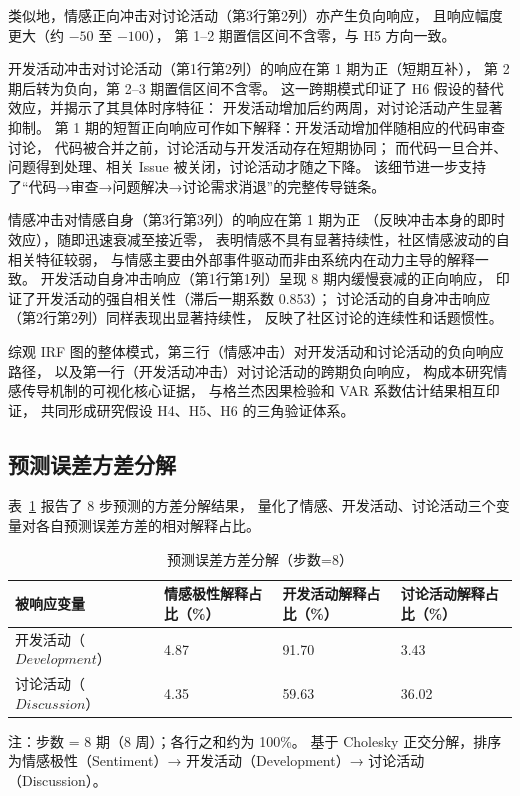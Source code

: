 \documentclass[
    type = master, %
    degree = professional,        %
    decl-page,  %
    twoside,                %
    fontset = fandol %
  ]{njuthesis}
\begin{document}
类似地，情感正向冲击对讨论活动（第3行第2列）亦产生负向响应，
且响应幅度更大（约 $-50$ 至 $-100$），
第 1--2 期置信区间不含零，与 H5 方向一致。

开发活动冲击对讨论活动（第1行第2列）的响应在第 1 期为正（短期互补），
第 2 期后转为负向，第 2--3 期置信区间不含零。
这一跨期模式印证了 H6 假设的替代效应，并揭示了其具体时序特征：
开发活动增加后约两周，对讨论活动产生显著抑制。
第 1 期的短暂正向响应可作如下解释：开发活动增加伴随相应的代码审查讨论，
代码被合并之前，讨论活动与开发活动存在短期协同；
而代码一旦合并、问题得到处理、相关 Issue 被关闭，讨论活动才随之下降。
该细节进一步支持了“代码→审查→问题解决→讨论需求消退”的完整传导链条。

情感冲击对情感自身（第3行第3列）的响应在第 1 期为正
（反映冲击本身的即时效应），随即迅速衰减至接近零，
表明情感不具有显著持续性，社区情感波动的自相关特征较弱，
与情感主要由外部事件驱动而非由系统内在动力主导的解释一致。
开发活动自身冲击响应（第1行第1列）呈现 8 期内缓慢衰减的正向响应，
印证了开发活动的强自相关性（滞后一期系数 0.853）；
讨论活动的自身冲击响应（第2行第2列）同样表现出显著持续性，
反映了社区讨论的连续性和话题惯性。

综观 IRF 图的整体模式，第三行（情感冲击）对开发活动和讨论活动的负向响应路径，
以及第一行（开发活动冲击）对讨论活动的跨期负向响应，
构成本研究情感传导机制的可视化核心证据，
与格兰杰因果检验和 VAR 系数估计结果相互印证，
共同形成研究假设 H4、H5、H6 的三角验证体系。

\subsection{预测误差方差分解}

表~\ref{tab:fevd} 报告了 8 步预测的方差分解结果，
量化了情感、开发活动、讨论活动三个变量对各自预测误差方差的相对解释占比。

\begin{table}[htbp]
    \centering
    \caption{预测误差方差分解（步数=8）}
    \label{tab:fevd}
    \begin{tabularx}{\textwidth}{p{3.5cm}XXX}
        \toprule
        被响应变量 & 情感极性解释占比（\%） & 开发活动解释占比（\%） & 讨论活动解释占比（\%） \\
        \midrule
        开发活动（$Development$）    & 4.87 & 91.70 & 3.43 \\
        讨论活动（$Discussion$） & 4.35 & 59.63 & 36.02 \\
        \bottomrule
    \end{tabularx}
    \begin{minipage}{\textwidth}
        \vspace{0.3em}
        \footnotesize 注：步数 = 8 期（8 周）；各行之和约为 100\%。
              基于 Cholesky 正交分解，排序为情感极性（Sentiment）→ 开发活动（Development）→ 讨论活动（Discussion）。
    \end{minipage}
\end{table}
\end{document}
